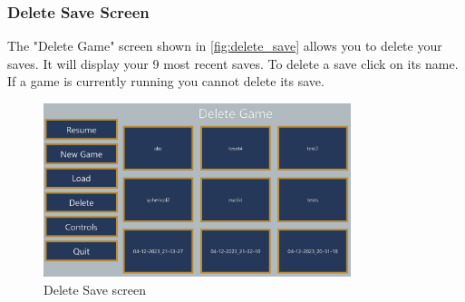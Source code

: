 \subsubsection{Delete Save Screen} \label{delete_save_screen}
The "Delete Game" screen shown in \autoref{fig:delete_save} allows you to delete your saves.
It will display your 9 most recent saves.
To delete a save click on its name.
If a game is currently running you cannot delete its save.

\begin{figure}[H]
    \centering
    \includegraphics[width=0.8\textwidth]{chapters/user_manual/resources/delete-game.png}
    \caption{Delete Save screen}
    \label{fig:delete_save}
\end{figure}